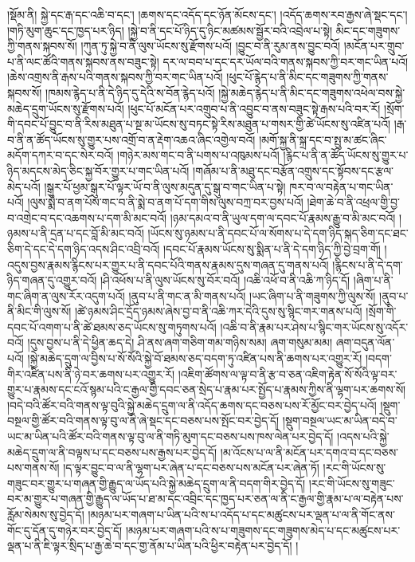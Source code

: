 །སྡོམ་ནི། སྐྱེ་དང་རྒ་དང་འཆི་བ་དང་། །ཆགས་དང་འདོད་དང་ཉོན་མོངས་དང་། །འདོད་ཆགས་རབ་རྒྱས་ཞེ་སྡང་དང་། །གཏི་མུག་ཆུང་དང་ཁྱད་པར་ཉིད། །སྐྱེ་བ་ནི་དང་པོ་ཉིད་དུ་ཉིང་མཚམས་སྦྱོར་བའི་འབྲེལ་པ་སྟེ། མིང་དང་གཟུགས་ཀྱི་གནས་སྐབས་སོ། །ཀུན་ཏུ་སྐྱེ་བ་ནི་ལུས་ཡོངས་སུ་རྫོགས་པའོ། །བྱུང་བ་ནི་རུམ་ནས་བྱུང་བའོ། །མངོན་པར་གྲུབ་པ་ནི་ལང་ཚོའི་གནས་སྐབས་ནས་བཟུང་སྟེ། དར་ལ་བབ་པ་དང་དར་ཡོལ་བའི་གནས་སྐབས་ཀྱི་བར་གང་ཡིན་པའོ། །ཆེས་འགྲས་ནི་རྒས་པའི་གནས་སྐབས་ཀྱི་བར་གང་ཡིན་པའོ། །ཕུང་པོ་རྙེད་པ་ནི་མིང་དང་གཟུགས་ཀྱི་གནས་སྐབས་སོ། །ཁམས་རྙེད་པ་ནི་དེ་ཉིད་དུ་དེའི་ས་བོན་རྙེད་པའོ། །སྐྱེ་མཆེད་རྙེད་པ་ནི་མིང་དང་གཟུགས་འཕེལ་བས་སྐྱེ་མཆེད་དྲུག་ཡོངས་སུ་རྫོགས་པའོ། །ཕུང་པོ་མངོན་པར་འགྲུབ་པ་ནི་འབྱུང་བ་ནས་བཟུང་སྟེ་རྒས་པའི་བར་རོ། །སྲོག་གི་དབང་པོ་བྱུང་བ་ནི་རིས་མཐུན་པ་སྔ་མ་ཡོངས་སུ་བཏང་སྟེ་རིས་མཐུན་པ་གསར་གྱི་ཚེ་ཡོངས་སུ་འཛིན་པའོ། །རྒ་བ་ནི་ན་ཚོད་ཡོངས་སུ་གྱུར་པས་འགྲོ་བ་ན་རྡེག་འཆའ་ཞིང་འགྱེལ་བའོ། །མགོ་སྐྱ་ནི་སྐྲ་དང་བ་སྤུ་མ་ཚང་ཞིང་མདོག་དཀར་བ་དང་སེར་བའོ། །གཉེར་མས་གང་བ་ནི་པགས་པ་འཁུམས་པའོ། །རྙིང་པ་ནི་ན་ཚོད་ཡོངས་སུ་གྱུར་པ་ཉིད་མདངས་མེད་ཅིང་སྐྱ་བོར་གྱུར་པ་གང་ཡིན་པའོ། །གཞོམ་པ་ནི་མཐུ་དང་བརྩོན་འགྲུས་དང་སྟོབས་དང་རྩལ་མེད་པའོ། །སྒུར་པོ་ཕྱམ་སྒུར་པོ་ལྟར་ཡོ་བ་ནི་ལུས་མདུན་དུ་སྒུ་བ་གང་ཡིན་པ་སྟེ། ཁར་བ་ལ་བརྟེན་པ་གང་ཡིན་པའོ། །ལུས་སྨེ་བ་ནག་པོས་གང་བ་ནི་སྨེ་བ་ནག་པོ་དག་གིས་ལུས་བཀྲ་བར་བྱས་པའོ། །ཐེག་ཆེ་བ་ནི་འཕྲལ་གྱི་བྱ་བ་འགྲེང་བ་དང་འཆགས་པ་དག་མི་མང་བའོ། །ཉམ་དམའ་བ་ནི་ཡུལ་དག་ལ་དབང་པོ་རྣམས་རྒྱུ་བ་མི་མང་བའོ། །ཉམས་པ་ནི་དྲན་པ་དང་བློ་མི་མང་བའོ། །ཡོངས་སུ་ཉམས་པ་ནི་དབང་པོ་ལ་སོགས་པ་དེ་དག་ཉིད་སྐད་ཅིག་དང་ཐང་ཅིག་དེ་དང་དེ་དག་ཉིད་འདས་ཤིང་འབྲི་བའོ། །དབང་པོ་རྣམས་ཡོངས་སུ་སྨིན་པ་ནི་དེ་དག་ཉིད་ཀྱི་བྱེ་བྲག་གོ། །འདུས་བྱས་རྣམས་རྙིངས་པར་གྱུར་པ་ནི་དབང་པོའི་གནས་རྣམས་དུས་གཞན་དུ་གནས་པའོ། །རྙིངས་པ་ནི་དེ་དག་ཉིད་གཞན་དུ་འགྱུར་བའོ། །ཤི་འཕོས་པ་ནི་ལུས་ཡོངས་སུ་བོར་བའོ། །འཆི་འཕོ་བ་ནི་འཆི་ཀ་ཉིད་དོ། །ཞིག་པ་ནི་གང་ཞིག་ན་ལུས་རོར་འདུག་པའོ། །ནུབ་པ་ནི་གང་ན་མི་གནས་པའོ། །ཡང་ཞིག་པ་ནི་གཟུགས་ཀྱི་ལུས་སོ། །ནུབ་པ་ནི་མིང་གི་ལུས་སོ། །ཚེ་ཉམས་ཤིང་དྲོད་ཉམས་ཞེས་བྱ་བ་ནི་འཆི་ཀར་དེའི་དུས་སུ་སྙིང་གར་གནས་པའོ། །སྲོག་གི་དབང་པོ་འགག་པ་ནི་ཚེ་ཐམས་ཅད་ཡོངས་སུ་གཏུགས་པའོ། །འཆི་བ་ནི་རྣམ་པར་ཤེས་པ་སྙིང་གར་ཡོངས་སུ་འདོར་བའོ། །དུས་བྱས་པ་ནི་དེ་ཕྱིན་ཆད་དེ། ཤི་ནས་ཞག་གཅིག་གམ་གཉིས་སམ། ཞག་གསུམ་མམ། ཞག་བདུན་ལོན་པའོ། །སྐྱེ་མཆེད་དྲུག་ལ་བྱིས་པ་སོ་སོའི་སྐྱེ་བོ་ཐམས་ཅད་བདག་ཏུ་འཛིན་པས་ནི་ཆགས་པར་འགྱུར་རོ། །བདག་གིར་འཛིན་པས་ནི་ཉེ་བར་ཆགས་པར་འགྱུར་རོ། །འཇིག་ཚོགས་ལ་ལྟ་བ་ནི་རྩ་བ་ཅན་འཇིག་རྟེན་སོ་སོའི་ལྟ་བར་གྱུར་པ་རྣམས་དང་ངའོ་སྙམ་པའི་ང་རྒྱལ་གྱི་དབང་ཅན་སྲེད་པ་རྣམ་པར་སྤྱོད་པ་རྣམས་ཀྱིས་ནི་ལྷག་པར་ཆགས་སོ། །བདེ་བའི་ཚོར་བའི་གནས་ལྟ་བུའི་སྐྱེ་མཆེད་དྲུག་ལ་ནི་འདོད་ཆགས་དང་བཅས་པས་རོ་མྱོང་བར་བྱེད་པའོ། །སྡུག་བསྔལ་གྱི་ཚོར་བའི་གནས་ལྟ་བུ་ལ་ནི་ཞེ་སྡང་དང་བཅས་པས་སྤོང་བར་བྱེད་དོ། །སྡུག་བསྔལ་ཡང་མ་ཡིན་བདེ་བ་ཡང་མ་ཡིན་པའི་ཚོར་བའི་གནས་ལྟ་བུ་ལ་ནི་གཏི་མུག་དང་བཅས་པས་ཁས་ལེན་པར་བྱེད་དོ། །འདས་པའི་སྐྱེ་མཆེད་དྲུག་ལ་ནི་བལྟས་པ་དང་བཅས་པས་རྒྱས་པར་བྱེད་དོ། །མ་འོངས་པ་ལ་ནི་མངོན་པར་དགའ་བ་དང་བཅས་པས་གནས་སོ། །ད་ལྟར་བྱུང་བ་ལ་ནི་ལྷག་པར་ཞེན་པ་དང་བཅས་པས་མངོན་པར་ཞེན་ཏོ། །རང་གི་ཡོངས་སུ་གཟུང་བར་གྱུར་པ་གཞན་གྱི་རྒྱུད་ལ་ཡོད་པའི་སྐྱེ་མཆེད་དྲུག་ལ་ནི་བདག་གིར་བྱེད་དོ། །རང་གི་ཡོངས་སུ་གཟུང་བར་མ་གྱུར་པ་གཞན་གྱི་རྒྱུད་ལ་ཡོད་པ་ཐ་མ་དང་འབྲིང་དང་ཁྱད་པར་ཅན་ལ་ནི་ང་རྒྱལ་གྱི་རྣམ་པ་ལ་བརྟེན་པས་རློམ་སེམས་སུ་བྱེད་དོ། །མཉམ་པར་གཞག་པ་ཡིན་པའི་ས་པ་འདོད་པ་དང་མཚུངས་པར་ལྡན་པ་ལ་ནི་གོང་ནས་གོང་དུ་དོན་དུ་གཉེར་བར་བྱེད་དོ། །མཉམ་པར་གཞག་པའི་ས་པ་གཟུགས་དང་གཟུགས་མེད་པ་དང་མཚུངས་པར་ལྡན་པ་ནི་ཇི་ལྟར་སྲིད་པ་རྒྱ་ཆེ་བ་དང་གྱ་ནོམ་པ་ཡིན་པའི་ཕྱིར་བརྟེན་པར་བྱེད་དོ། །

